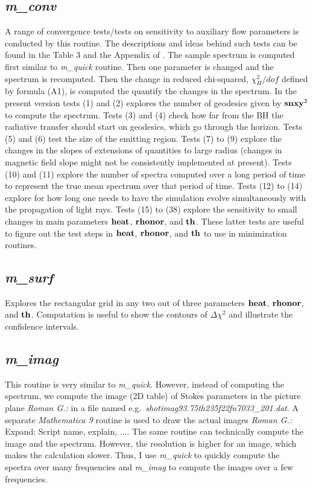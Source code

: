 \documentclass{emulateapj}
\newcommand{\mat}{\textit{Mathematica 9 }}
\newcommand{\rg}[1]{\color{blue}\textit{Roman G.:} #1\color{black}}
\begin{document}
\subsection{\textit{m\_conv}}
A range of convergence tests/tests on sensitivity to auxiliary flow
parameters is conducted by this routine.  The descriptions and ideas
behind such tests can be found in the Table 3 and the Appendix of
\citet{Shcherbakov:2012appl}.  The sample spectrum is computed first
similar to \textit{m\_quick} routine. Then one parameter is changed
and the spectrum is recomputed.  Then the change in reduced
chi-squared, $\chi^2_H/dof$ defined by formula (A1), is computed the
quantify the changes in the spectrum.  In the present version tests
(1) and (2) explores the number of geodesics given by ${\bf snxy}^2$
to compute the spectrum.  Tests (3) and (4) check how far from the BH
the radiative transfer should start on geodesics, which go through the
horizon.  Tests (5) and (6) test the size of the emitting region.
Tests (7) to (9) explore the changes in the slopes of extensions of
quantities to large radius (changes in magnetic field slope might not
be consistently implemented at present).  Tests (10) and (11) explore
the number of spectra computed over a long period of time to represent
the true mean spectrum over that period of time.  Tests (12) to (14)
explore for how long one needs to have the simulation evolve
simultaneously with the propagation of light rays.  Tests (15) to (38)
explore the sensitivity to small changes in main parameters ${\bf
  heat}$, ${\bf rhonor}$, and ${\bf th}$.  These latter tests are
useful to figure out the test steps in ${\bf heat}$, ${\bf rhonor}$,
and ${\bf th}$ to use in minimization routines.

\subsection{\textit{m\_surf}}
Explores the rectangular grid in any two out of three parameters ${\bf
  heat}$, ${\bf rhonor}$, and ${\bf th}$.  Computation is useful to
show the contours of $\Delta\chi^2$ and illustrate the confidence
intervals.

\subsection{\textit{m\_imag}}
This routine is very similar to \textit{m\_quick}. However, instead of
computing the spectrum, we compute the image (2D table) of Stokes
parameters in the picture plane \rg{in a file named
  e.g.~\textit{shotimag93.75th235f22fn7033\_201.dat}}. A separate \mat
routine is used to draw the actual images \rg{Expand: Script name,
  explain, ...}.  The same routine can technically compute the image
and the spectrum.  However, the resolution is higher for an image,
which makes the calculation slower.  Thus, I use \textit{m\_quick} to
quickly compute the spectra over many frequencies and \textit{m\_imag}
to compute the images over a few frequencies.
\end{document}
